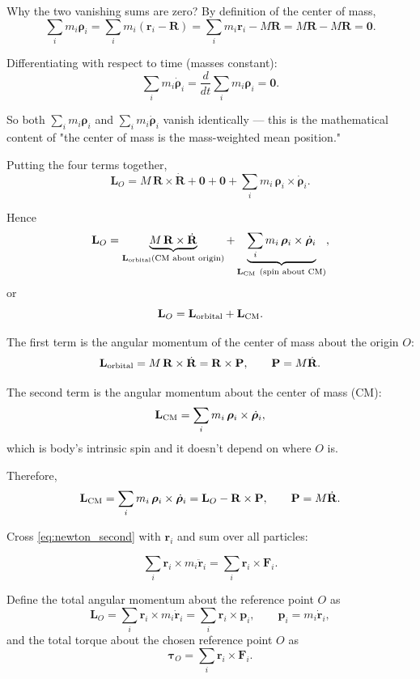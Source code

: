 \documentclass[a4paper,11pt]{article}
\begin{document}
Why the two vanishing sums are zero?  By definition of the center of mass,
\[
\sum_i m_i\boldsymbol\rho_i
=
\sum_i m_i(\mathbf r_i-\mathbf R)
=
\sum_i m_i\mathbf r_i-M\mathbf R
=
M\mathbf R-M\mathbf R
=
\mathbf 0.
\]

Differentiating with respect to time (masses constant):
\[
\sum_i m_i\dot{\boldsymbol\rho}_i
=
\frac{d}{dt}\sum_i m_i\boldsymbol\rho_i
=
\mathbf 0.
\]

So both \(\sum_i m_i\boldsymbol\rho_i\) and
\(\sum_i m_i\dot{\boldsymbol\rho}_i\) vanish identically — this is the mathematical
content of "the center of mass is the mass-weighted mean position."

Putting the four terms together,
\[
\mathbf L_O
=
M\,\mathbf R\times\dot{\mathbf R}
+\mathbf 0+\mathbf 0
+\sum_i m_i\,\boldsymbol\rho_i\times\dot{\boldsymbol\rho}_i.
\]

Hence
\[
\mathbf L_O
=
\underbrace{M\,\mathbf R\times\dot{\mathbf R}}_{\mathbf L_{\rm orbital} \text{(CM about origin)}}
+
\underbrace{\sum_i m_i\,\boldsymbol\rho_i\times\dot{\boldsymbol\rho}_i}_{\mathbf L_{\rm CM}\ \text{(spin about CM)}},
\]
or
\[
\mathbf L_O=\mathbf L_{\rm orbital} + \mathbf L_{\rm CM}.
\]

The first term is the angular momentum of the center of mass about the origin $O$:
\[
\mathbf L_{\rm orbital}
=
M\,\mathbf R\times\dot{\mathbf R}
=
\mathbf R\times\mathbf P,
\qquad
\mathbf P=M\dot{\mathbf R}.
\]

The second term is the angular momentum about the center of mass (CM):
\[
\mathbf L_{\rm CM}
=
\sum_i m_i\,\boldsymbol\rho_i\times\dot{\boldsymbol\rho}_i,
\]
which is body’s intrinsic spin and it doesn't depend on where $O$ is.

Therefore,
\[
\mathbf L_{\rm CM}
=
\sum_i m_i\,\boldsymbol\rho_i\times\dot{\boldsymbol\rho}_i
=
\mathbf L_O - \mathbf R\times\mathbf P,
\qquad
\mathbf P=M\dot{\mathbf R}.
\]

\hrulefill

Cross \eqref{eq:newton_second} with $\mathbf r_i$ and sum over all particles:

\begin{equation}
\sum_i \mathbf r_i\times m_i\ddot{\mathbf r}_i
=
\sum_i \mathbf r_i\times \mathbf F_i .
\label{eq:newton_cross}
\end{equation}

Define the total angular momentum about the reference point $O$ as
\[
\mathbf L_O
=
\sum_i \mathbf r_i\times m_i\dot{\mathbf r}_i
=
\sum_i \mathbf r_i\times \mathbf p_i,
\qquad
\mathbf p_i
=
m_i\dot{\mathbf r}_i,
\]
and the total torque about the chosen reference point $O$ as
\[
\boldsymbol\tau_O
=
\sum_i \mathbf r_i\times \mathbf F_i.
\]
\end{document}
